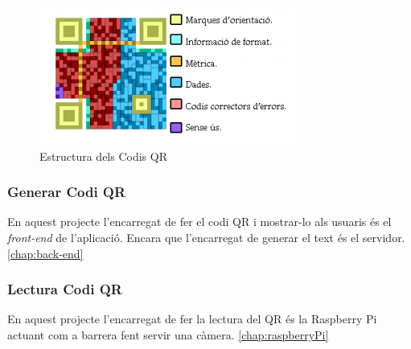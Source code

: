 \begin{figure}[H]
    \begin{center}
      \includegraphics[scale=1]{Fotos/EstructuraCodiQR.png}
    \end{center}
    \caption{Estructura dels Codis QR}
    \label{fig:compiler_phases}
  \end{figure}

\subsubsection{Generar Codi QR}

En aquest projecte l'encarregat de fer el codi QR i mostrar-lo als usuaris és el \emph{front-end} de l'aplicació. Encara que
l'encarregat de generar el text és el servidor. \autoref{chap:back-end}

\subsubsection{Lectura Codi QR}


En aquest projecte l'encarregat de fer la lectura del QR és la Raspberry Pi actuant com a barrera fent servir una càmera.
\autoref{chap:raspberryPi}